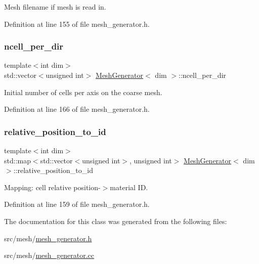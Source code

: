 Mesh filename if mesh is read in. 



Definition at line 155 of file mesh\+\_\+generator.\+h.

\mbox{\label{class_mesh_generator_a4d73b2d6a3f66e8a696e2228dc53fb76}} 
\subsubsection{\texorpdfstring{ncell\+\_\+per\+\_\+dir}{ncell\_per\_dir}}
{\footnotesize\ttfamily template$<$int dim$>$ \\
std\+::vector$<$unsigned int$>$ \hyperlink{class_mesh_generator}{Mesh\+Generator}$<$ dim $>$\+::ncell\+\_\+per\+\_\+dir\hspace{0.3cm}{\ttfamily [private]}}



Initial number of cells per axis on the coarse mesh. 



Definition at line 166 of file mesh\+\_\+generator.\+h.

\mbox{\label{class_mesh_generator_a4d3e0a3f830a2fa4d35d7f269fba3b02}} 
\subsubsection{\texorpdfstring{relative\+\_\+position\+\_\+to\+\_\+id}{relative\_position\_to\_id}}
{\footnotesize\ttfamily template$<$int dim$>$ \\
std\+::map$<$std\+::vector$<$unsigned int$>$, unsigned int$>$ \hyperlink{class_mesh_generator}{Mesh\+Generator}$<$ dim $>$\+::relative\+\_\+position\+\_\+to\+\_\+id\hspace{0.3cm}{\ttfamily [private]}}



Mapping\+: cell relative position-\/$>$material ID. 



Definition at line 159 of file mesh\+\_\+generator.\+h.



The documentation for this class was generated from the following files\+:\begin{DoxyCompactItemize}
\item 
src/mesh/\hyperlink{mesh__generator_8h}{mesh\+\_\+generator.\+h}\item 
src/mesh/\hyperlink{mesh__generator_8cc}{mesh\+\_\+generator.\+cc}\end{DoxyCompactItemize}
